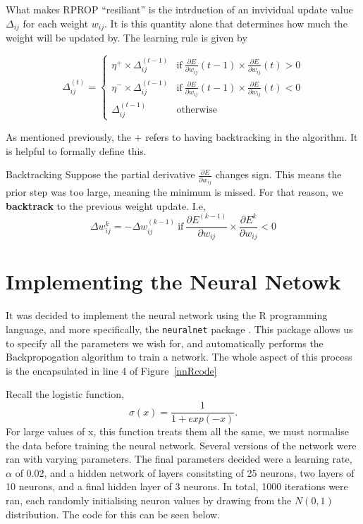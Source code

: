 What makes RPROP ``resiliant'' is the intrduction of an invividual update value $\Delta_{ij}$ for each weight $w_{ij}$. It is this quantity alone that determines 
how much the weight will be updated by. The learning rule is given by 

\begin{equation}
    \Delta_{ij}^{(t)} = 
    \begin{cases}
        \eta^{+}\times \Delta_{ij}^{(t-1)} & \text{if} \  \frac{\partial E}{\partial w_{ij}}(t-1)\times\frac{\partial E}{\partial w_{ij}}(t) > 0 \\
        \eta^{-}\times \Delta_{ij}^{(t-1)} & \text{if} \  \frac{\partial E}{\partial w_{ij}}(t-1)\times\frac{\partial E}{\partial w_{ij}}(t) < 0 \\
        \Delta_{ij}^{(t-1)} & \text{otherwise}
    \end{cases}
\end{equation}

As mentioned previously, the $+$ refers to having backtracking in the algorithm. It is helpful to formally define this.

\begin{definition}{Backtracking}
    Suppose the partial derivative $\frac{\partial E}{\partial w_{ij}}$ changes sign. This means the prior step was too large, meaning the minimum is missed. For that reason, 
    we \textbf{backtrack} to the previous weight update. I.e,
    \[
        \Delta w_{ij}^k = -\Delta w_{ij}^{(k-1)} \  \text{if} \  \frac{\partial E^{(k-1)}}{\partial w_{ij}} \times \frac{\partial E^k}{\partial w_{ij}} < 0 
    \]
\end{definition}

\section{Implementing the Neural Netowk}
It was decided to implement the neural network using the R programming language, and more specifically, the \verb|neuralnet| package \cite{gunther}. This package 
allows us to specify all the parameters we wish for, and automatically performs the Backpropogation algorithm to train a network. The whole aspect of this process is the encapsulated in line 4
of Figure~\ref{nnRcode}

Recall the logistic function, $$\sigma(x) = \frac{1}{1+exp(-x)}.$$ For large values of x, this function treats them all the same, we must normalise the data before training the neural 
network. Several versions of the network were ran with varying parameters. The final parameters decided were a learning rate, $\alpha$ of 0.02, and a hidden network of layers consitsting of 
25 neurons, two layers of 10 neurons, and a final hidden layer of 3 neurons. In total, 1000 iterations were ran, each randomly initialising neuron values by drawing from the $N(0,1)$ distribution. 
The code for this can be seen below.

